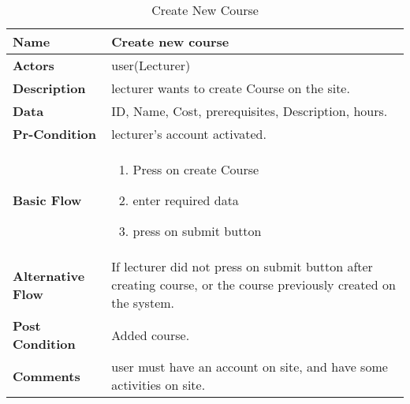 \documentclass[../Psychological_system_web_application.tex]{subfiles}
\begin{document}
	\begin{center}
		\begin{table}[h]
			\begin{tabular}{ | m{4cm} | m{10cm}| } 
				\hline
			 	\textbf{\large Name}& Create new course\\ 
				\hline
			  	\textbf{\large Actors}& user(Lecturer)\\ 
				\hline
			  	\textbf{\large Description}& lecturer  wants to create Course on the site.\\ 
				\hline
				\textbf{\large Data}& ID, Name, Cost, prerequisites, Description, hours.\\ 
				\hline
				 \textbf{\large Pr-Condition}& lecturer's account activated. \\ 
				\hline
				\textbf{\large Basic Flow}&\begin{enumerate}
				\item
					Press on create Course
				\item
					enter required data
				\item
					press on submit button \end{enumerate}\\
					\hline
				\textbf{\large Alternative Flow}& If lecturer did not press on submit button after creating course, or the course previously created on the system.\\ 
				\hline
				\textbf{\large Post Condition}& Added course.\\ 
				\hline
				\textbf{\large Comments}& user must have an account on site, and have some activities on site.\\ 
				\hline
			\end{tabular}
			\caption{Create New Course}
			\label{table:CREATE-COURSE}
		\end{table}
	\end{center}
\end{document}
